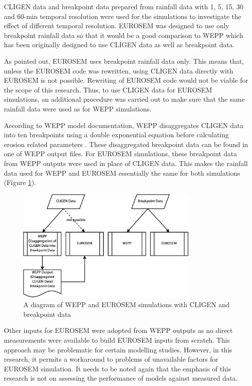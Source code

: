 CLIGEN data and breakpoint data prepared from rainfall data with 1, 5, 15,
30 and 60-min temporal resolution were used for the simulations to investigate
the effect of different temporal resolution.
EUROSEM was designed to use only breakpoint rainfall data so that it would
be a good comparison to WEPP which has been originally designed to use CLIGEN
data as well as breakpoint data.

As pointed out, EUROSEM uses breakpoint rainfall data only. This means that,
unless the EUROSEM code was rewritten, using CLIGEN data directly with EUROSEM
is not possible. Rewriting of EUROSEM code would not be viable for the scope of
this research. Thus, to use CLIGEN data for EUROSEM simulations, an additional
procedure was carried out to make sure that the same rainfall data were used as
for WEPP simulations.

According to WEPP model documentation, WEPP disaggregates CLIGEN data into ten
breakpoints using a double exponential equation before calculating erosion
related parameters \citep[see][\S 2.2]{flanagan1995-usda}. These disaggregated
breakpoint data can be found in one of WEPP output files. For EUROSEM
simulations, these breakpoint data from WEPP outputs were used in place of
CLIGEN data. This makes the rainfall data used for WEPP and EUROSEM essentially
the same for both simulations (Figure \ref{fig:eurosem_cligen_workaround}).

\begin{figure}[htbp]
  \centering
    \includegraphics[width=0.8\textwidth]{./img/eurosem_cligen_workaround}
  \caption{A diagram of WEPP and EUROSEM simulations with CLIGEN and breakpoint
data}
  \label{fig:eurosem_cligen_workaround}
\end{figure}

Other inputs for EUROSEM were adopted from WEPP outputs as no direct
measurements were available to build EUROSEM inputs from scratch. This approach
may be problematic for certain modelling studies. However, in this research, it
permits a workaround to problems of unavailable factors for EUROSEM simulation.
It needs to be noted again that the emphasis of this research is not on
assessing the performance of models against measured data.

